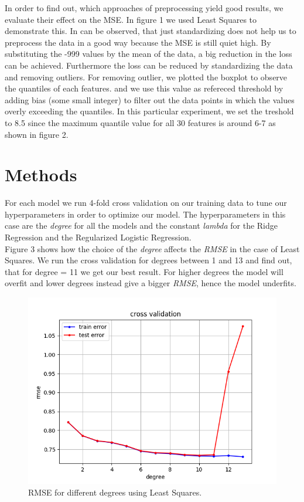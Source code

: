 \documentclass[10pt,conference,compsocconf]{IEEEtran}
\begin{document}
In order to find out, which approaches of preprocessing yield good results, we evaluate their effect on the MSE. In figure 1 we used Least Squares to demonstrate this. In can be observed, that just standardizing does not help us to preprocess the data in a good way because the MSE is still quiet high. 
By substituting the -999 values by the mean of the data, a big reduction in the loss can be achieved. Furthermore the loss can be reduced by standardizing the data and removing outliers. For removing outlier, we plotted the boxplot to observe the quantiles of each features. and we use this value as refereced threshold by adding bias (some small integer) to filter out the data points in which the values overly exceeding the quantiles. In this particular experiment, we set the treshold to 8.5 since the maximum quantile value for all 30 features is around 6-7 as shown in figure 2.\\



\section{Methods}
\label{sec:tips-writing}


For each model we run 4-fold cross validation on our training data to tune our hyperparameters in order to optimize our model. The hyperparameters in this case are the \textit{degree} for all the models and the constant \textit{lambda} for the Ridge Regression and the Regularized Logistic Regression.
\\
Figure 3 shows how the choice of the \textit{degree} affects the \textit{RMSE} in the case of Least Squares. We run the cross validation for degrees between 1 and 13 and find out, that for degree = 11 we get our best result. For higher degrees the model will overfit and lower degrees instead give a bigger \textit{RMSE}, hence the model underfits.

\begin{figure}[htbp]
  \centering
  \includegraphics[width=\columnwidth]{cross_validation_leastsquares.png}
  \caption{RMSE for different degrees using Least Squares.}
  \vspace{-3mm}
  \label{fig:crossvalidationleastsquares}
\end{figure}
\end{document}

